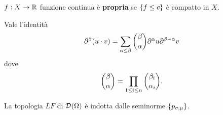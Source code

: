 \begin{definition}
$f:X\to \mathbb{R}$ funzione continua \`e \textbf{propria} se $\left\{{f\leq c}\right\}$ \`e compatto in $X$.
\end{definition}

\begin{remark}
Vale l'identit\`a
\[\partial^\beta(u\cdot v)=\sum_{\alpha\leq \beta}\binom{\beta}{\alpha}\partial^\alpha u\partial^{\beta-\alpha}v\]
dove
\[\binom\beta{\alpha}=\prod_{1\leq i\leq n}\binom{\beta_i}{\alpha_i}.\]
\end{remark}

\begin{proposition}\label{PrTopologizzazioneInNormeDiLimiteInduttivoDOmega}
La topologia $LF$ di $\mathcal{D}(\Omega)$ \`e indotta dalle seminorme $\left\{{p_{\sigma,\mu}}\right\}$.
\end{proposition}
